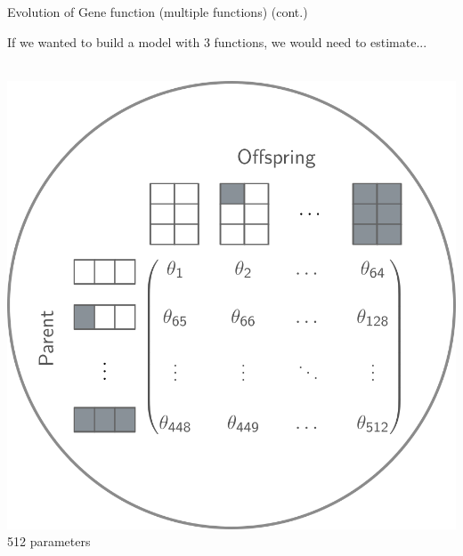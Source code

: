 \documentclass[10pt,aspectratio=169]{beamer}
\newcounter{frame}[frame]
\begin{document}
\begin{frame}[c]{Evolution of Gene function (multiple functions) (cont.)}
	
	If we wanted to build a model with 3 functions, we would need to estimate...\\\bigskip
	
	\begin{minipage}[t]{.40\linewidth}
		\centering
		\\\bigskip
		\includegraphics[width=.8\linewidth]{aphylo-ergm-eq1.png} \\
			\vfill 512 parameters
	\end{minipage}\hfill
	\begin{minipage}[t]{.19\linewidth}
		\centering 
\end{minipage}
\end{frame}
\end{document}
